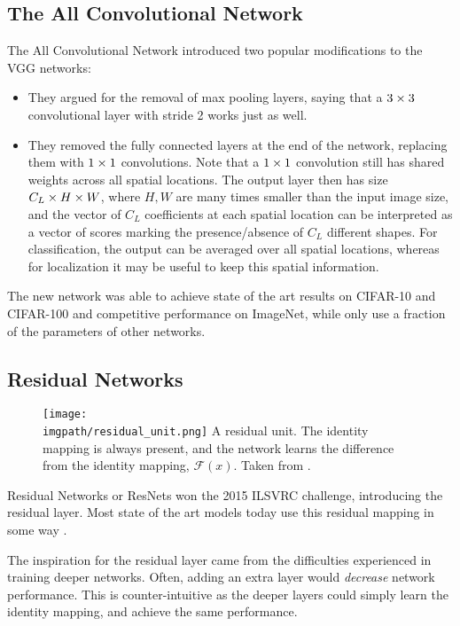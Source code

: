 \subsection{The All Convolutional Network}
The All Convolutional Network \cite{springenberg_striving_2015} introduced two
popular modifications to the VGG networks:
%
\begin{itemize}
  \item They argued for the removal of max pooling layers, saying that a $3\times 3$
    convolutional layer with stride 2 works just as well.
  \item They removed the fully connected layers at the end of the network,
    replacing them with $1\times 1$ convolutions. Note that a $1\times 1$ convolution
    still has shared weights across all spatial locations. The output layer then
    has size $C_L \times H \times W$, where $H, W$ are many times smaller than the input
    image size, and the vector of $C_L$ coefficients at each spatial location
    can be interpreted as a vector of scores marking the presence/absence of
    $C_L$ different shapes. For classification, the output can be averaged over
    all spatial locations, whereas for localization it may be useful to keep
    this spatial information.
\end{itemize}
The new network was able to achieve state of the art results on CIFAR-10 and
CIFAR-100 and competitive performance on ImageNet, while only use a fraction of
the parameters of other networks.

\subsection{Residual Networks}\label{sec:ch2:resnets}
  \begin{figure}[tb]
    \centering
    \texttt{[image: \\imgpath/residual\_unit.png]}
          {A residual unit. The identity mapping is always present, and the
            network learns the difference from the identity mapping, $\mathcal{F}(x)$.
            Taken from \cite{he_deep_2016}.}
      \label{fig:ch2:residual_unit}
  \end{figure}
  Residual Networks or ResNets won the 2015 ILSVRC challenge, introducing the
  residual layer. Most state of the art models today use this residual mapping
  in some way \cite{zagoruyko_wide_2016, xie_aggregated_2017}.

  The inspiration for the residual layer came from the difficulties
  experienced in training deeper networks. Often, adding an extra layer would
  \emph{decrease} network performance. This is counter-intuitive as the deeper
  layers could simply learn the identity mapping, and achieve the same
  performance.

